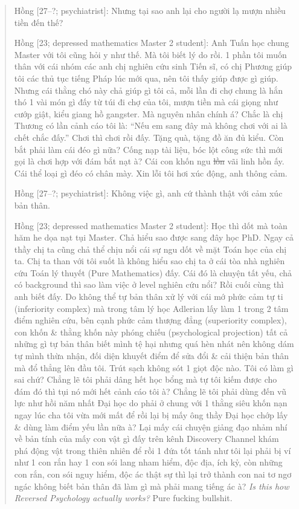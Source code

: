 \documentclass[12pt,twoside]{book}
\begin{document}
\begin{quote}
	{\sf Hồng [27--?; psychiatrist]}: Nhưng tại sao anh lại cho người lạ mượn nhiều tiền đến thế?
	
	{\sf Hồng [23; depressed mathematics Master 2 student]}: Anh Tuấn học chung Master với tôi cũng hỏi y như thế. Mà tôi biết lý do rồi. 1 phần tôi muốn thân với cái nhóm các anh chị nghiên cứu sinh Tiến sĩ, có chị Phương giúp tôi các thủ tục tiếng Pháp lúc mới qua, nên tôi thấy giúp được gì giúp. Nhưng cái thằng chó này chả giúp gì tôi cả, mỗi lần đi chợ chung là hắn thó 1 vài món gì đấy từ túi đi chợ của tôi, mượn tiền mà cái giọng như cướp giật, kiểu giang hồ gangster. Mà nguyên nhân chính á? Chắc là chị Thương có lần cảnh cáo tôi là: ``Nếu em sang đây mà không chơi với ai là chết chắc đấy.'' Chơi thì chơi rồi đấy. Tặng quà, tặng đồ ăn đủ kiểu. Còn bắt phải làm cái đéo gì nữa? Cống nạp tài liệu, bóc lột công sức thì mới gọi là chơi hợp với đám bắt nạt à? Cái con khốn ngu \st{lồn} vãi linh hồn ấy. Cái thể loại gì đéo có chân mày. Xin lỗi tôi hơi xúc động, anh thông cảm.
	
	{\sf Hồng [27--?; psychiatrist]}: Không việc gì, anh cứ thành thật với cảm xúc bản thân.
	
	{\sf Hồng [23; depressed mathematics Master 2 student]}: Học thì dốt mà toàn hăm he dọa nạt tụi Master. Chả hiểu sao được sang đây học PhD. Ngay cả thầy chị ta cũng chả thể chịu nổi cái sự ngu dốt về mặt Toán học của chị ta. Chị ta than với tôi suốt là không hiểu sao chị ta ở cái tòa nhà nghiên cứu Toán lý thuyết (Pure Mathematics) đấy. Cái đó là chuyện tất yếu, chả có background thì sao làm việc ở level nghiên cứu nổi? Rồi cuối cùng thì anh biết đấy. Do không thể tự bản thân xử lý với cái mớ phức cảm tự ti (inferiority complex) mà trong tâm lý học Adlerian lấy làm 1 trong 2 tâm điểm nghiên cứu, bên cạnh phức cảm thượng đẳng (superiority complex), con khốn \& thằng khốn này phóng chiếu (psychological projection) tất cả những gì tự bản thân biết mình tệ hại nhưng quá hèn nhát nên không dám tự mình thừa nhận, đối diện khuyết điểm để sửa đổi \& cải thiện bản thân mà đổ thẳng lên đầu tôi. Trút sạch không sót 1 giọt độc nào. Tôi có làm gì sai chứ? Chẳng lẽ tôi phải dâng hết học bổng mà tự tôi kiếm được cho đám đó thì tụi nó mới hết cảnh cáo tôi à? Chẳng lẽ tôi phải dùng đến vũ lực như hồi năm nhất Đại học do phải ở chung với 1 thằng siêu khốn nạn ngay lúc cha tôi vừa mới mất để rồi lại bị mấy ông thầy Đại học chớp lấy \& dùng làm điểm yếu lần nữa à? Lại mấy cái chuyện giảng đạo nhảm nhí về bản tính của mấy con vật gì đấy trên kênh Discovery Channel khám phá động vật trong thiên nhiên để rồi 1 đứa tốt tánh như tôi lại phải bị ví như 1 con rắn hay 1 con sói lang nham hiểm, độc địa, ích kỷ, còn những con rắn, con sói nguy hiểm, độc ác thật sự thì lại trở thành con nai tơ ngơ ngác không biết bản thân đã làm gì mà phải mang tiếng ác à? {\it Is this how Reversed Psychology actually works?} Pure fucking bullshit.
	

\end{quote}
\end{document}
